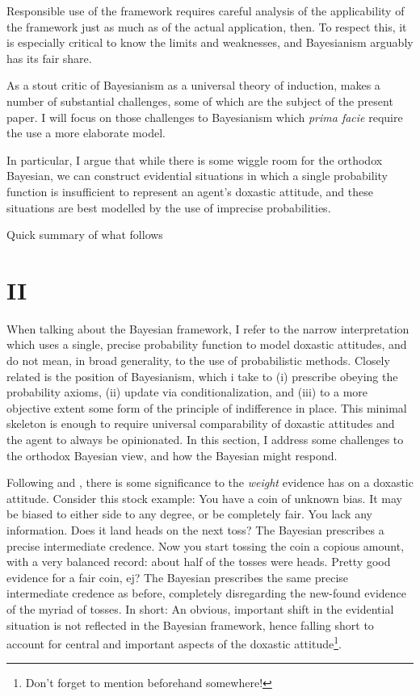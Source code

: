 \documentclass[11pt, a4paper]{scrartcl}
\begin{document}
Responsible use of the framework requires careful analysis of the applicability of the framework just as much as of the actual application, then. To respect this, it is especially critical to know the limits and weaknesses, and Bayesianism arguably has its fair share.  

As a stout critic of Bayesianism as a universal theory of induction, \citet{Norton2011-NORCTB} makes a number of substantial challenges, some of which are the subject of the present paper. I will focus on those challenges to Bayesianism which \emph{prima facie} require the use a more elaborate model.

In particular, I argue that while there is some wiggle room for the orthodox Bayesian, we can construct evidential situations in which a single probability function is insufficient to represent an agent's doxastic attitude, and these situations are best modelled by the use of imprecise probabilities.

Quick summary of what follows
\section{II}

When talking about the Bayesian framework, I refer to the narrow interpretation \citet{Norton2011-NORCTB} which uses a single, precise probability function to model doxastic attitudes, and do not mean, in broad generality, to the use of probabilistic methods. Closely related is the position of Bayesianism, which i take to (i) prescribe obeying the probability axioms, (ii) update via conditionalization, and (iii) to a more objective extent some form of the principle of indifference in place. This minimal skeleton is enough to require universal comparability of doxastic attitudes and the agent to always be opinionated. In this section, I address some challenges to the orthodox Bayesian view, and how the Bayesian might respond. 

Following \citet{Joyce2005-JOYHPR} and \citet{sep-imprecise-probabilities}, there is some significance to the \emph{weight} evidence has on a doxastic attitude. Consider this stock example: You have a coin of unknown bias. It may be biased to either side to any degree, or be completely fair. You lack any information. Does it land heads on the next toss? The Bayesian prescribes a precise intermediate credence. Now you start tossing the coin a copious amount, with a very balanced record: about half of the tosses were heads. Pretty good evidence for a fair coin, ej? The Bayesian prescribes the same precise intermediate credence as before, completely disregarding the new-found evidence of the myriad of tosses. In short: An obvious, important shift in the evidential situation is not reflected in the Bayesian framework, hence falling short to account for central and important aspects of the doxastic attitude\footnote{Don't forget to mention beforehand somewhere!}. 
\end{document}

